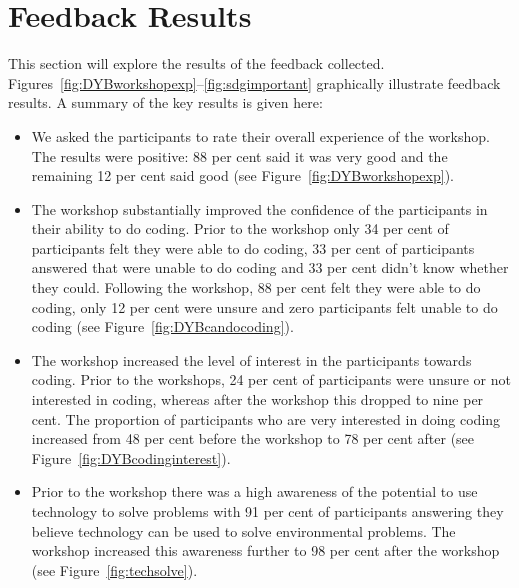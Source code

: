 \documentclass[12pt]{report} %
\begin{document}

\goodbreak
\section{Feedback Results} %
This section will explore the results of the feedback collected. %
Figures~\ref{fig:DYBworkshopexp}--\ref{fig:sdgimportant} graphically illustrate feedback results. A summary of the key results is given here:
\begin{itemize}
\item We asked the participants to rate their overall experience of the workshop. The results were positive: 88 per cent said it was very good and the remaining 12 per cent said good (see Figure~\ref{fig:DYBworkshopexp}).

\item The workshop substantially improved the confidence of the participants in their ability to do coding. Prior to the workshop only 34 per cent of participants felt they were able to do coding, 33 per cent of participants answered that were unable to do coding and 33 per cent didn't know whether they could. Following the workshop, 88 per cent felt they were able to do coding, only 12 per cent were unsure and zero participants felt unable to do coding (see Figure~\ref{fig:DYBcandocoding}).

\item The workshop increased the level of interest in the participants towards coding. Prior to the workshops, 24 per cent of participants were unsure or not interested in coding, whereas after the workshop this dropped to nine per cent. The proportion of participants who are very interested in doing coding increased from 48 per cent before the workshop to 78 per cent after (see Figure~\ref{fig:DYBcodinginterest}). 

 \item Prior to the workshop there was a high awareness of the potential to use technology to solve problems with 91 per cent of participants answering they believe technology can be used to solve environmental problems. The workshop increased this awareness further to 98 per cent after the workshop (see Figure~\ref{fig:techsolve}). 
 

\end{itemize}
\end{document}
